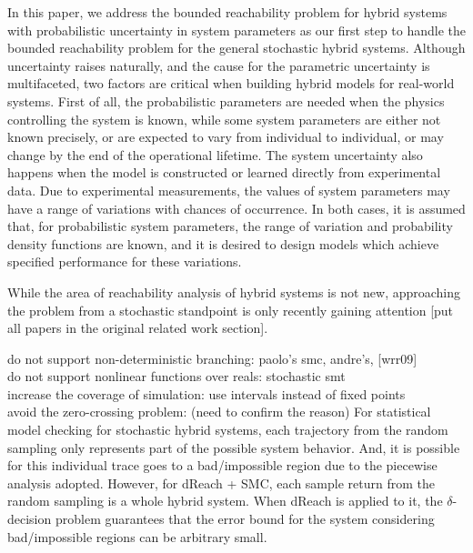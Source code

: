 \documentclass[runningheads,a4paper]{llncs}
\begin{document}
In this paper, we address the bounded reachability problem for hybrid systems with probabilistic uncertainty in system parameters as our first step to handle the bounded reachability problem for the general stochastic hybrid systems. Although uncertainty raises naturally, and the cause for the parametric uncertainty is multifaceted, two factors are critical when building hybrid models for real-world systems. First of all, the probabilistic parameters are needed when the physics controlling the system is known, while some system parameters are either not known precisely, or are expected to vary from individual to individual, or may change by the end of the operational lifetime. The system uncertainty also happens when the model is constructed or learned directly from experimental data. Due to experimental measurements, the values of system parameters may have a range of variations with chances of occurrence. In both cases, it is assumed that, for probabilistic system parameters, the range of variation and probability density functions are known, and it is desired to design models which achieve specified performance for these variations. 

While the area of reachability analysis of hybrid systems is not new, approaching the problem from a stochastic standpoint is only recently gaining attention [put all papers in the original related work section].

do not support non-deterministic branching: paolo's smc, andre's, [wrr09]\\
do not support nonlinear functions over reals: stochastic smt\\
increase the coverage of simulation: use intervals instead of fixed points\\
avoid the zero-crossing problem: (need to confirm the reason) For statistical model checking for stochastic hybrid systems, each trajectory from the random sampling only represents part of the possible system behavior. And, it is possible for this individual trace goes to a bad/impossible region due to the piecewise analysis adopted. However, for dReach + SMC, each sample return from the random sampling is a whole hybrid system. When dReach is applied to it, the $\delta$-decision problem guarantees that the error bound for the system considering bad/impossible regions can be arbitrary small. 
 
\end{document}
